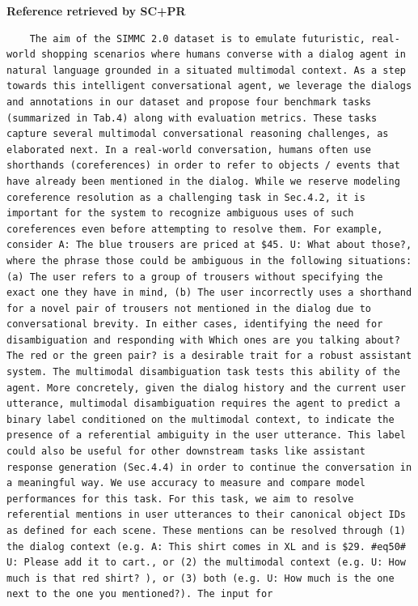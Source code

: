 \textbf{Reference retrieved by SC+PR}
\begin{lstlisting}
    The aim of the SIMMC 2.0 dataset is to emulate futuristic, real-world shopping scenarios where humans converse with a dialog agent in natural language grounded in a situated multimodal context. As a step towards this intelligent conversational agent, we leverage the dialogs and annotations in our dataset and propose four benchmark tasks (summarized in Tab.4) along with evaluation metrics. These tasks capture several multimodal conversational reasoning challenges, as elaborated next. In a real-world conversation, humans often use shorthands (coreferences) in order to refer to objects / events that have already been mentioned in the dialog. While we reserve modeling coreference resolution as a challenging task in Sec.4.2, it is important for the system to recognize ambiguous uses of such coreferences even before attempting to resolve them. For example, consider A: The blue trousers are priced at $45. U: What about those?, where the phrase those could be ambiguous in the following situations: (a) The user refers to a group of trousers without specifying the exact one they have in mind, (b) The user incorrectly uses a shorthand for a novel pair of trousers not mentioned in the dialog due to conversational brevity. In either cases, identifying the need for disambiguation and responding with Which ones are you talking about? The red or the green pair? is a desirable trait for a robust assistant system. The multimodal disambiguation task tests this ability of the agent. More concretely, given the dialog history and the current user utterance, multimodal disambiguation requires the agent to predict a binary label conditioned on the multimodal context, to indicate the presence of a referential ambiguity in the user utterance. This label could also be useful for other downstream tasks like assistant response generation (Sec.4.4) in order to continue the conversation in a meaningful way. We use accuracy to measure and compare model performances for this task. For this task, we aim to resolve referential mentions in user utterances to their canonical object IDs as defined for each scene. These mentions can be resolved through (1) the dialog context (e.g. A: This shirt comes in XL and is $29. #eq50# U: Please add it to cart., or (2) the multimodal context (e.g. U: How much is that red shirt? ), or (3) both (e.g. U: How much is the one next to the one you mentioned?). The input for
\end{lstlisting}

